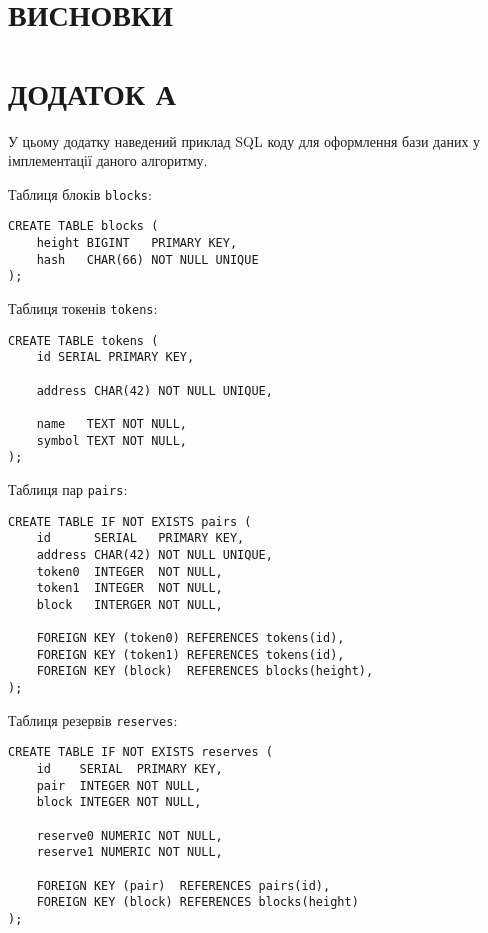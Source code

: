 \documentclass[14pt]{extarticle}
\begin{document}
\newpage

\section{ВИСНОВКИ}

\newpage

\printbibliography{}
\newpage

\section{ДОДАТОК А}\label{sec:addition-a}

У цьому додатку наведений приклад SQL коду для оформлення бази даних у
імплементації даного алгоритму.

Таблиця блоків \texttt{blocks}:

\begin{verbatim}
CREATE TABLE blocks (
    height BIGINT   PRIMARY KEY,
    hash   CHAR(66) NOT NULL UNIQUE
);
\end{verbatim}

Таблиця токенів \texttt{tokens}:

\begin{verbatim}
CREATE TABLE tokens (
    id SERIAL PRIMARY KEY,

    address CHAR(42) NOT NULL UNIQUE,

    name   TEXT NOT NULL,
    symbol TEXT NOT NULL,
);
\end{verbatim}

Таблиця пар \texttt{pairs}:

\begin{verbatim}
CREATE TABLE IF NOT EXISTS pairs (
    id      SERIAL   PRIMARY KEY,
    address CHAR(42) NOT NULL UNIQUE,
    token0  INTEGER  NOT NULL,
    token1  INTEGER  NOT NULL,
    block   INTERGER NOT NULL,

    FOREIGN KEY (token0) REFERENCES tokens(id),
    FOREIGN KEY (token1) REFERENCES tokens(id),
    FOREIGN KEY (block)  REFERENCES blocks(height),
);
\end{verbatim}

Таблиця резервів \texttt{reserves}:

\begin{verbatim}
CREATE TABLE IF NOT EXISTS reserves (
    id    SERIAL  PRIMARY KEY,
    pair  INTEGER NOT NULL,
    block INTEGER NOT NULL,

    reserve0 NUMERIC NOT NULL,
    reserve1 NUMERIC NOT NULL,

    FOREIGN KEY (pair)  REFERENCES pairs(id),
    FOREIGN KEY (block) REFERENCES blocks(height)
);
\end{verbatim}
\end{document}

